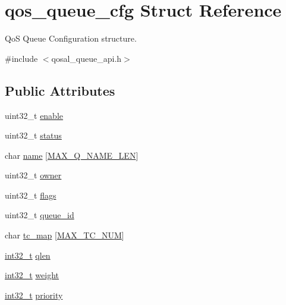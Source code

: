 \hypertarget{structqos__queue__cfg}{\section{qos\-\_\-queue\-\_\-cfg Struct Reference}
\label{structqos__queue__cfg}
}


Qo\-S Queue Configuration structure.  




{\ttfamily \#include $<$qosal\-\_\-queue\-\_\-api.\-h$>$}

\subsection*{Public Attributes}
\begin{DoxyCompactItemize}
\item 
uint32\-\_\-t \hyperlink{structqos__queue__cfg_a9f29f1f01fcceaa20a155f384d2ba1ba}{enable}
\item 
uint32\-\_\-t \hyperlink{structqos__queue__cfg_a5606d7eca82540293ea53b343f0e55c3}{status}
\item 
char \hyperlink{structqos__queue__cfg_a1a3367219d1ddc63ec994f57bbeb59f0}{name} \mbox{[}\hyperlink{group__FAPI__QOS__QUEUE_ga8c2658456d4f94c43de2b47e6cc488eb}{M\-A\-X\-\_\-\-Q\-\_\-\-N\-A\-M\-E\-\_\-\-L\-E\-N}\mbox{]}
\item 
uint32\-\_\-t \hyperlink{structqos__queue__cfg_af7f5644a58135f1b6f52a818ce958675}{owner}
\item 
uint32\-\_\-t \hyperlink{structqos__queue__cfg_ae62e947c5c062e477347f21b34586901}{flags}
\item 
uint32\-\_\-t \hyperlink{structqos__queue__cfg_ab510e8e08dc8ab97b37e80cd86025c2b}{queue\-\_\-id}
\item 
char \hyperlink{structqos__queue__cfg_a1571ed347d8821847dcf966c0e26d034}{tc\-\_\-map} \mbox{[}\hyperlink{group__FAPI__QOS__QUEUE_ga75e5a2112ac055521c4cb0e64b278be8}{M\-A\-X\-\_\-\-T\-C\-\_\-\-N\-U\-M}\mbox{]}
\item 
\hyperlink{commondefs_8h_a32f2e37ee053cf2ce8ca28d1f74630e5}{int32\-\_\-t} \hyperlink{structqos__queue__cfg_a11b6e0171620866d462244ccaf97e40a}{qlen}
\item 
\hyperlink{commondefs_8h_a32f2e37ee053cf2ce8ca28d1f74630e5}{int32\-\_\-t} \hyperlink{structqos__queue__cfg_a4a188cdf7f60a129d2909fc6335f120b}{weight}
\item 
\hyperlink{commondefs_8h_a32f2e37ee053cf2ce8ca28d1f74630e5}{int32\-\_\-t} \hyperlink{structqos__queue__cfg_a0016a6fbcc623edf864ce6b0a51e4a53}{priority}

\end{DoxyCompactItemize}
